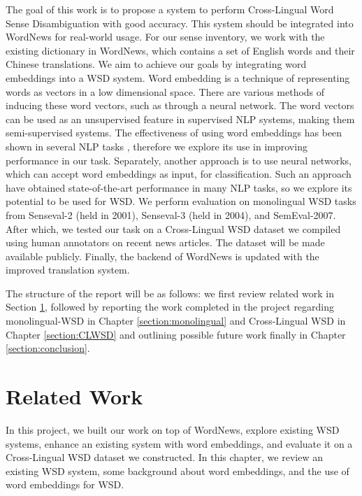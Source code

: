 \documentclass[11pt]{article}
\begin{document}
The goal of this work is to propose a system to perform Cross-Lingual Word Sense Disambiguation with good accuracy. This system should be integrated into WordNews for real-world usage. 
For our sense inventory, we work with the existing dictionary in WordNews, which contains a set of English words and their Chinese translations. We aim to achieve our goals by integrating word embeddings into a WSD system. 
Word embedding is a technique of representing words as vectors in a low dimensional space. There are various methods of inducing these word vectors, such as through a neural network. The word vectors can be used as an unsupervised feature in supervised NLP systems, making them semi-supervised systems. The effectiveness of
using word embeddings has been shown in 
several NLP tasks \cite{Turian10wordrepresentations}, therefore we explore its use in improving performance in our task. Separately, another approach is to use neural networks, which can accept word embeddings as input, for classification. Such an approach have obtained state-of-the-art performance in many NLP tasks, so we explore its potential to be used for WSD. We perform evaluation on monolingual WSD tasks from Senseval-2 (held in 2001), Senseval-3 (held in 2004), and SemEval-2007. After which, we tested our task on a Cross-Lingual WSD dataset we compiled using human annotators on recent news articles. The dataset will be made available publicly.  Finally, the backend of WordNews is updated with the improved translation system. 

The structure of the report will be as follows: we  first review related work in Section \ref{ch:related}, followed by reporting the work completed in the project regarding monolingual-WSD in Chapter \ref{section:monolingual} and Cross-Lingual WSD in Chapter \ref{section:CLWSD} and outlining possible future work finally in Chapter \ref{section:conclusion}. 


\section{Related Work}
\label{ch:related}

In this project, we built our work on top of WordNews, explore existing WSD systems, enhance an existing system with word embeddings, and evaluate it on a Cross-Lingual WSD dataset we constructed. In this chapter, we review an existing WSD system, some background about word embeddings, and the use of word embeddings for WSD. 
\end{document}
